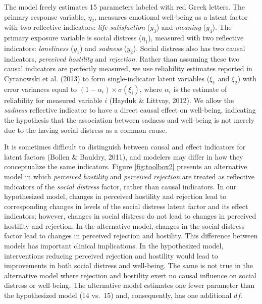 \documentclass[
  english,
  man]{apa6}
\begin{document}
The model freely estimates 15 parameters labeled with red Greek letters. The primary response variable, \(\eta_{2}\), measures emotional well-being as a latent factor with two reflective indicators: \emph{life satisfaction} (\(y_3\)) and \emph{meaning} (\(y_4\)). The primary exposure variable is social distress (\(\eta_{1}\)), measured with two reflective indicators: \emph{loneliness} (\(y_1\)) and \emph{sadness} (\(y_2\)). Social distress also has two causal indicators, \emph{perceived hostility} and \emph{rejection}. Rather than assuming these two causal indicators are perfectly measured, we use reliability estimates reported in Cyranowski et al. (2013) to form single-indicator latent variables (\(\xi_1\) and \(\xi_2\)) with error variances equal to \((1-\alpha_i)\times \sigma(\xi_i)\), where \(\alpha_i\) is the estimate of reliability for measured variable \(i\) (Hayduk \& Littvay, 2012). We allow the \emph{sadness} reflective indicator to have a direct causal effect on well-being, indicating the hypothesis that the association between sadness and well-being is not merely due to the having social distress as a common cause.

It is sometimes difficult to distinguish between causal and effect indicators for latent factors (Bollen \& Bauldry, 2011), and modelers may differ in how they conceptualize the same indicators. Figure \ref{fig:toolbox2} presents an alternative model in which \emph{perceived hostility} and \emph{perceived rejection} are treated as reflective indicators of the \emph{social distress} factor, rather than causal indicators. In our hypothesized model, changes in perceived hostility and rejection lead to corresponding changes in levels of the social distress latent factor and its effect indicators; however, changes in social distress do not lead to changes in perceived hostility and rejection. In the alternative model, changes in the social distress factor lead to changes in perceived rejection and hostility. This difference between models has important clinical implications. In the hypothesized model, interventions reducing perceived rejection and hostility would lead to improvements in both social distress and well-being. The same is not true in the alternative model where rejection and hostility exert no causal influence on social distress or well-being. The alternative model estimates one fewer parameter than the hypothesized model (14 vs.~15) and, consequently, has one additional \(df\).
\end{document}
